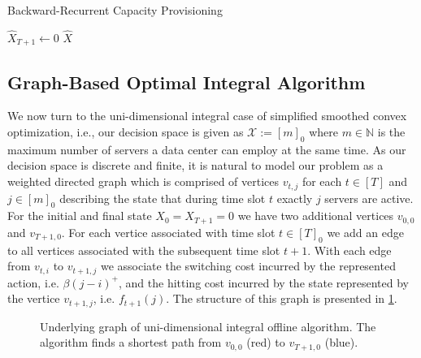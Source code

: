 \begin{algorithm}
    \caption{Backward-Recurrent Capacity Provisioning~\cite{Lin2011}}\label{alg:brcp}
    $\hat{X}_{T+1} \gets 0$\;
    \Return $\hat{X}$\;
\end{algorithm}

\subsection{Graph-Based Optimal Integral Algorithm}\label{section:offline_algorithms:ud:graph_based}

We now turn to the uni-dimensional integral case of simplified smoothed convex optimization, i.e., our decision space is given as $\mathcal{X} := [m]_0$ where $m \in \mathbb{N}$ is the maximum number of servers a data center can employ at the same time. As our decision space is discrete and finite, it is natural to model our problem as a weighted directed graph which is comprised of vertices $v_{t,j}$ for each $t \in [T]$ and $j \in [m]_0$ describing the state that during time slot $t$ exactly $j$ servers are active. For the initial and final state $X_0 = X_{T+1} = 0$ we have two additional vertices $v_{0,0}$ and $v_{T+1,0}$. For each vertice associated with time slot $t \in [T]_0$ we add an edge to all vertices associated with the subsequent time slot $t + 1$. With each edge from $v_{t,i}$ to $v_{t+1,j}$ we associate the switching cost incurred by the represented action, i.e. $\beta (j - i)^+$, and the hitting cost incurred by the state represented by the vertice $v_{t+1,j}$, i.e. $f_{t+1}(j)$. The structure of this graph is presented in \cref{fig:underlying_graph_of_uni_dimensional_integral_offline_algorithm}.

\begin{figure}
    \centering
    \resizebox{\textwidth}{!}{}
    \caption{Underlying graph of uni-dimensional integral offline algorithm. The algorithm finds a shortest path from $v_{0,0}$ (red) to $v_{T+1,0}$ (blue).}
    \label{fig:underlying_graph_of_uni_dimensional_integral_offline_algorithm}
\end{figure}


